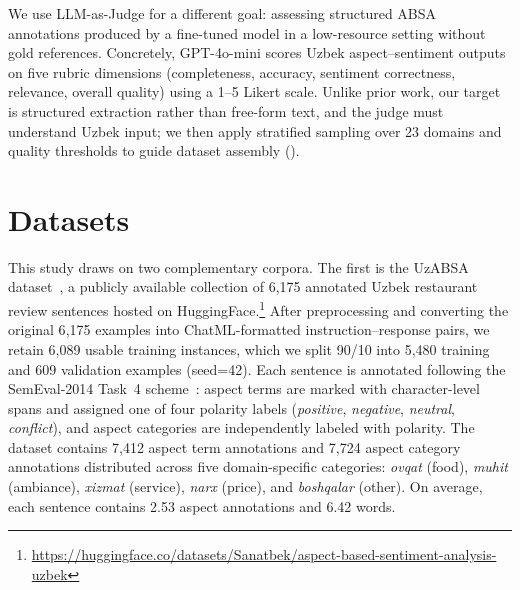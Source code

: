 \documentclass[computers,article,submit,pdftex,moreauthors]{Definitions/mdpi}
\begin{document}
We use LLM-as-Judge for a different goal: assessing structured ABSA annotations produced by a fine-tuned model in a low-resource setting without gold references. Concretely, GPT-4o-mini scores Uzbek aspect--sentiment outputs on five rubric dimensions (completeness, accuracy, sentiment correctness, relevance, overall quality) using a 1--5 Likert scale. Unlike prior work, our target is structured extraction rather than free-form text, and the judge must understand Uzbek input; we then apply stratified sampling over 23 domains and quality thresholds to guide dataset assembly ().




\section{Datasets}
\label{sec:datasets}
This study draws on two complementary corpora. The first is the UzABSA dataset~\cite{matlatipov2024uzabsa}, a publicly available collection of 6{,}175 annotated Uzbek restaurant review sentences hosted on HuggingFace.\footnote{\url{https://huggingface.co/datasets/Sanatbek/aspect-based-sentiment-analysis-uzbek}} After preprocessing and converting the original 6{,}175 examples into ChatML-formatted instruction--response pairs, we retain 6{,}089 usable training instances, which we split 90/10 into 5{,}480 training and 609 validation examples (seed=42). Each sentence is annotated following the SemEval-2014 Task~4 scheme~\cite{pontiki-etal-2014-semeval}: aspect terms are marked with character-level spans and assigned one of four polarity labels (\textit{positive}, \textit{negative}, \textit{neutral}, \textit{conflict}), and aspect categories are independently labeled with polarity. The dataset contains 7{,}412 aspect term annotations and 7{,}724 aspect category annotations distributed across five domain-specific categories: \textit{ovqat} (food), \textit{muhit} (ambiance), \textit{xizmat} (service), \textit{narx} (price), and \textit{boshqalar} (other). On average, each sentence contains 2.53 aspect annotations and 6.42 words.
\end{document}
